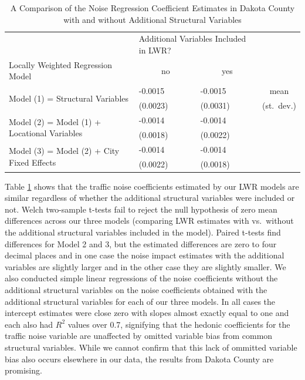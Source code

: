 \documentclass{article}\usepackage{graphicx, color}
\begin{document}
\begin{table}[ht]
\begin{center}
\caption{A Comparison of the Noise Regression Coefficient Estimates in Dakota County with and without Additional Structural Variables}\label{tab:Dak}
\begin{tabular}{lllc}
 & \multicolumn{2}{p{1.25in}}{Additional Variables Included in LWR?} & \\
Locally Weighted Regression Model & \multicolumn{1}{c}{no} & \multicolumn{1}{c}{yes} & \\ \cline{1-3}
\multirow{2}{*}{Model (1) = Structural Variables} & -0.0015 & -0.0015 & mean\\ 
   & (0.0023) & (0.0031) & (st.\ dev.) \\[.2cm]
\multirow{2}{*}{Model (2) = Model (1) + Locational Variables} & -0.0014 & -0.0014  & \\ 
   & (0.0018) & (0.0022) &  \\[.2cm] 
\multirow{2}{*}{Model (3) = Model (2) + City Fixed Effects} & -0.0014 & -0.0014 & \\ 
   & (0.0022) & (0.0018) & \\ 
\end{tabular}
\end{center}
\end{table}

Table \ref{tab:Dak} shows that the traffic noise coefficients estimated by our LWR models are similar regardless of whether the additional structural variables were included or not. Welch two-sample t-tests fail to reject the null hypothesis of zero mean differences across our three models (comparing LWR estimates with vs.\ without the additional structural variables included in the model). Paired t-tests find differences for Model 2 and 3, but the estimated differences are zero to four decimal places and in one case the noise impact estimates with the additional variables are slightly larger and in the other case they are slightly smaller. We also conducted simple linear regressions of the noise coefficients without the additional structural variables on the noise coefficients obtained with the additional structural variables for each of our three models. In all cases the intercept estimates were close zero with slopes almost exactly equal to one and each also had $R^2$ values over 0.7, signifying that the hedonic coefficients for the traffic noise variable are unaffected by omitted variable bias from common structural variables. While we cannot confirm that this lack of ommitted variable bias also occurs elsewhere in our data, the results from Dakota County are promising. 
\end{document}
